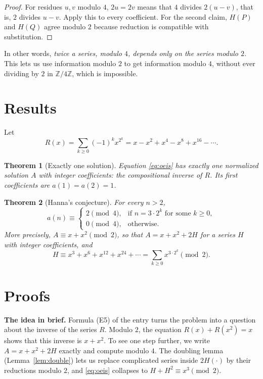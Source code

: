 \documentclass[11pt,a4paper]{article}
\newtheorem{theorem}{Theorem}[section]
\theoremstyle{definition}
\theoremstyle{remark}
\newcommand{\Z}{\mathbb{Z}}
\newcommand{\para}[1]{\par\medskip\noindent\textbf{#1}\enspace}
\begin{document}
\begin{proof}
For residues $u,v$ modulo $4$, $2u=2v$ means that $4$ divides $2(u-v)$, that is, $2$ divides $u-v$. Apply this to
every coefficient. For the second claim, $H(P)$ and $H(Q)$ agree modulo $2$ because reduction is compatible with
substitution.
\end{proof}
In other words, \emph{twice a series, modulo $4$, depends only on the series modulo $2$.} This lets us use information modulo
$2$ to get information modulo $4$, without ever dividing by $2$ in $\Z/4\Z$, which is impossible.

\section{Results}\label{sec:results}

Let
\[
R(x)=\sum_{k\ge0}(-1)^kx^{2^k}=x-x^2+x^4-x^8+x^{16}-\cdots .
\]

\begin{theorem}[Exactly one solution]\label{thm:exist}
Equation \eqref{eq:oeis} has exactly one normalized solution $A$ with integer coefficients: the compositional inverse
of $R$. Its first coefficients are $a(1)=a(2)=1$.
\end{theorem}

\begin{theorem}[Hanna's conjecture]\label{thm:main}
For every $n>2$,
\[
a(n)\equiv\begin{cases}2\pmod4,&\text{if }n=3\cdot2^k\text{ for some }k\ge0,\\[2pt]0\pmod4,&\text{otherwise.}\end{cases}
\]
More precisely, $A\equiv x+x^2\pmod 2$, so that $A=x+x^2+2H$ for a series $H$ with integer coefficients, and
\[
H\equiv x^3+x^6+x^{12}+x^{24}+\cdots=\sum_{k\ge0}x^{3\cdot2^k}\pmod 2 .
\]
\end{theorem}

\section{Proofs}\label{sec:proofs}

\para{The idea in brief.} Formula (E5) of the entry turns the problem into a question about the inverse of the
series $R$. Modulo $2$, the equation $R(x)+R(x^2)=x$ shows that this inverse is $x+x^2$. To see one step further, we
write $A=x+x^2+2H$ exactly and compute modulo $4$. The doubling lemma (Lemma~\ref{lem:double}) lets us replace
complicated series inside $2H(\cdot)$ by their reductions modulo $2$, and \eqref{eq:oeis} collapses to
$H+H^2\equiv x^3\pmod 2$.
\end{document}

